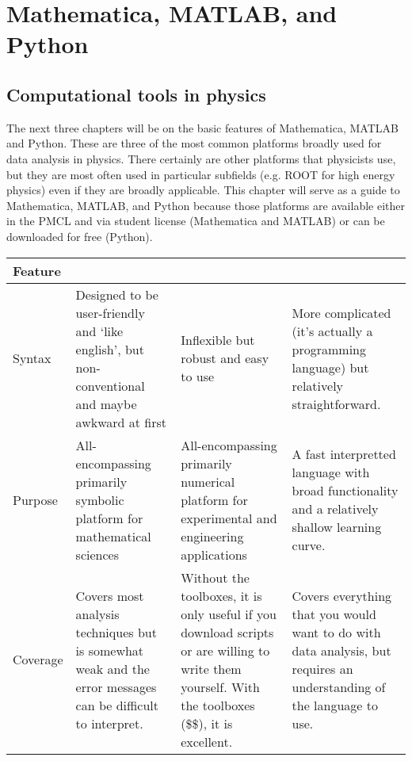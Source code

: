 

\chapter{Mathematica, MATLAB, and Python}


\section{Computational tools in physics}

The next three chapters will be on the basic features of Mathematica, MATLAB and Python. These are three of the most common platforms broadly used for data analysis in physics. There certainly are other platforms that physicists use, but they are most often used in particular subfields (e.g. ROOT for high energy physics) even if they are broadly applicable. This chapter will serve as a guide to Mathematica, MATLAB, and Python because those platforms are available either in the PMCL and via student license (Mathematica and MATLAB) or can be downloaded for free (Python).



\begin{center}
{\renewcommand{\arraystretch}{1.2}
    \begin{tabular}{ |  p{1.5 cm}|| p{4 cm } | p{4 cm} || p{4 cm}|}
   \hline
	Feature &	\avantfont	{Mathematica} & \avantfont	{MATLAB} & \avantfont	{Python} \\ \hline \hline
	Syntax & Designed to be user-friendly and `like english', but non-conventional and maybe awkward at first & Inflexible but robust and easy to use & More complicated (it's actually a programming language) but relatively straightforward. \\ \hline
	Purpose & All-encompassing primarily symbolic platform for mathematical sciences & All-encompassing primarily numerical platform for experimental and engineering applications & A fast interpretted language with broad functionality and a relatively shallow learning curve. \\ \hline
	Coverage & Covers most analysis techniques but is somewhat weak and the error messages can be difficult to interpret. & Without the toolboxes, it is only useful if you download scripts or are willing to write them yourself. With the toolboxes (\$\$), it is excellent. & Covers everything that you would want to do with data analysis, but requires an understanding of the language to use. \\ \hline
	\end{tabular}		}
\end{center} 

